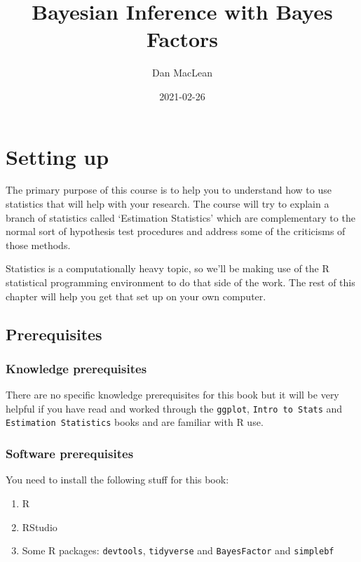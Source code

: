 \documentclass[
]{book}
\title{Bayesian Inference with Bayes Factors}
\author{Dan MacLean}
\date{2021-02-26}
\providecommand{\tightlist}{%
  \setlength{\itemsep}{0pt}\setlength{\parskip}{0pt}}
\begin{document}
\maketitle

{
\setcounter{tocdepth}{1}
\tableofcontents
}
\hypertarget{setting-up}{%
\chapter{Setting up}\label{setting-up}}

The primary purpose of this course is to help you to understand how to use statistics that will help with your research. The course will try to explain a branch of statistics called `Estimation Statistics' which are complementary to the normal sort of hypothesis test procedures and address some of the criticisms of those methods.

Statistics is a computationally heavy topic, so we'll be making use of the R statistical programming environment to do that side of the work. The rest of this chapter will help you get that set up on your own computer.

\hypertarget{prerequisites}{%
\section{Prerequisites}\label{prerequisites}}

\hypertarget{knowledge-prerequisites}{%
\subsection{Knowledge prerequisites}\label{knowledge-prerequisites}}

There are no specific knowledge prerequisites for this book but it will be very helpful if you have read and worked through the \texttt{ggplot}, \texttt{Intro\ to\ Stats} and \texttt{Estimation\ Statistics} books and are familiar with R use.

\hypertarget{software-prerequisites}{%
\subsection{Software prerequisites}\label{software-prerequisites}}

You need to install the following stuff for this book:

\begin{enumerate}
\def\labelenumi{\arabic{enumi}.}
\tightlist
\item
  R
\item
  RStudio
\item
  Some R packages: \texttt{devtools}, \texttt{tidyverse} and \texttt{BayesFactor} and \texttt{simplebf}
\end{enumerate}
\end{document}
